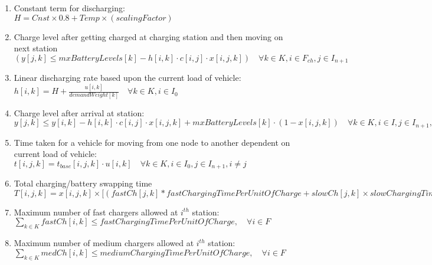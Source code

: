 \documentclass[conference]{IEEEtran}
\begin{document}
\begin{enumerate}
    \item Constant term for discharging: \\
    $ H = Cnst\times 0.8 + Temp \times (scalingFactor)$ 
    
    \item Charge level after getting charged at charging station and then moving on next station \\
    $ \left( y[j, k] \leq mxBatteryLevels[k] - h[i, k] \cdot c[i, j] \cdot x[i, j, k] \right) \quad \forall k \in K, i \in F_{ch}, j \in I_{n+1}$
    
    \item Linear discharging rate based upon the current load of vehicle: \\
    $ h[i, k] = H + \frac{u[i, k]}{demandWeight[k]} \quad \forall k \in K, i \in I_{0}$\\
    
    \item  Charge level after arrival at station: \\
    $  y[j, k] \leq y[i, k] - h[i, k] \cdot c[i, j] \cdot x[i, j, k] + mxBatteryLevels[k] \cdot (1 - x[i, j, k])   \quad \forall k \in K {, } i \in I, j \in I_{n+1}, i \neq j $
    
    \item Time taken for a vehicle for moving from one node to another dependent on current load of vehicle: \\
    $t[i, j, k] = t_{base}[i, j, k] \cdot u[i, k] \quad  \forall k \in K, i \in I_{0}, j \in I_{n+1}, i \neq j$
   
    
    \item Total charging/battery swapping time \\
    $ T[i,j,k] = x[i, j, k]\times [(fastCh[j,k]*fastChargingTimePerUnitOfCharge + slowCh[j,k]\times slowChargingTimePerUnitOfCharge + medCh[j,k]\times mediumChargingTimePerUnitOfCharge)  \times (mxBatteryLevels[k]-y[j,k])+batterySwap[j,k]\times batterySwapTime) \quad \forall k \in K, i \in I_{0} \cup F_{comb}, j \in F_{comb}, i \neq j$\\
    
    \item Maximum number of fast chargers  allowed at $i^{th}$ station: \\ 
    $ \sum_{k \in K} fastCh[i, k] \leq fastChargingTimePerUnitOfCharge, \quad \forall i \in F $
    \item Maximum number of medium chargers  allowed at $i^{th}$ station:\\ 
    $\sum_{k \in K} medCh[i, k] \leq mediumChargingTimePerUnitOfCharge, \quad \forall i \in F$ \\
    

\end{enumerate}
\end{document}
